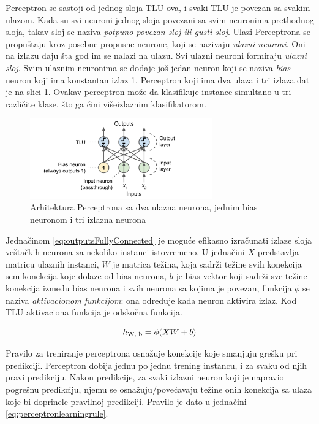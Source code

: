 \documentclass[a4paper,12pt]{report}
\begin{document}
Perceptron se sastoji od jednog sloja TLU-ova, i svaki TLU je povezan sa svakim ulazom. Kada su svi neuroni jednog sloja povezani sa svim neuronima prethodnog sloja, takav sloj se naziva \textit{potpuno povezan sloj ili gusti sloj}. Ulazi Perceptrona se propuštaju kroz posebne propusne neurone, koji se nazivaju \textit{ulazni neuroni}. Oni na izlazu daju šta god im se nalazi na ulazu. Svi ulazni neuroni formiraju \textit{ulazni sloj}. Svim ulaznim neuronima se dodaje još jedan neuron  koji se naziva \textit{bias} neuron koji ima konstantan izlaz 1. Perceptron koji ima dva ulaza i tri izlaza dat je na slici \ref{fig:perceptron2i3o}. Ovakav perceptron može da klasifikuje instance simultano u tri različite klase, što ga čini višeizlaznim klasifikatorom. 

\begin{figure}[h]
    \centering
    \includegraphics[width=0.7\textwidth]{perceptron_2_i_3_o.png}
    \caption{Arhitektura Perceptrona sa dva ulazna neurona, jednim bias neuronom i tri izlazna neurona}\label{fig:perceptron2i3o}
\end{figure}

Jednačinom \eqref{eq:outputsFullyConnected} je moguće efikasno izračunati izlaze sloja veštačkih neurona za nekoliko instanci istovremeno. U jednačini $X$ predstavlja matricu ulaznih instanci, $W$ je matrica težina, koja sadrži težine svih konekcija sem konekcija koje dolaze od bias neurona, $b$ je bias vektor koji sadrži sve težine konekcija između bias neurona i svih neurona sa kojima je povezan, funkcija $\phi$ se naziva \textit{aktivacionom funkcijom}: ona određuje kada neuron aktivira izlaz. Kod TLU aktivaciona funkcija je odskočna funkcija. 

\begin{equation}\label{eq:outputsFullyConnected}
h\textsubscript{W, b} = \phi (XW + b)
\end{equation}

Pravilo za treniranje perceptrona osnažuje konekcije koje smanjuju grešku pri predikciji. Perceptron dobija jednu po jednu trening instancu, i za svaku od njih pravi predikciju. Nakon predikcije, za svaki izlazni neuron koji je napravio pogrešnu predikciju, njemu se osnažuju/povećavaju težine onih konekcija sa ulaza koje bi doprinele pravilnoj predikciji. Pravilo je dato u jednačini \eqref{eq:perceptronlearningrule}.
\end{document}
